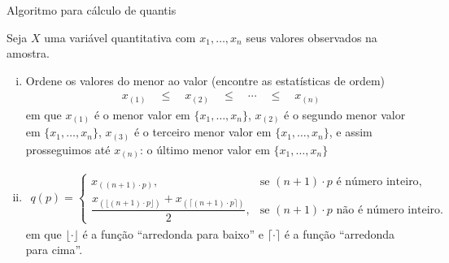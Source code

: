 \documentclass[8pt]{beamer}
\begin{document}
\begin{frame}{Algoritmo para cálculo de quantis}
 
 Seja $X$ uma variável quantitativa com $x_1, \dots, x_n$ seus valores observados na amostra. 
 \vfill
 
  \begin{enumerate}[i.]
   \item Ordene os valores do menor ao valor (encontre as estatísticas de ordem)
   \begin{align*}
    x_{(1)} \quad \leq \quad x_{(2)} \quad \leq \quad \cdots \quad \leq \quad x_{(n)}
   \end{align*}
   em que $x_{(1)}$ é o menor valor em $\{x_1, \dots, x_n\}$, $x_{(2)}$ é o segundo menor valor em $\{x_1, \dots, x_n\}$, $x_{(3)}$ é o terceiro menor valor em $\{x_1, \dots, x_n\}$, e assim prosseguimos até
   $x_{(n)}$: o último menor valor em $\{x_1, \dots, x_n\}$
   \vfill
   
   \item 
   \begin{align*}
    q(p) = \begin{cases}
            x_{\left((n+1)\cdot p \right)}, & \mbox{se } (n+1)\cdot p \mbox{ é número inteiro},\\
            \dfrac{x_{\left(\lfloor(n+1)\cdot p\rfloor \right)} + x_{\left( \lceil(n+1)\cdot p \rceil \right)}}{2}, & \mbox{se } (n+1)\cdot p \mbox{ não é número inteiro}.
           \end{cases}
   \end{align*}
   em que $\lfloor \cdot \rfloor$ é a função ``arredonda para baixo'' e $\lceil \cdot \rceil$ é a função ``arredonda para cima''.
  \end{enumerate}
\end{frame}
\end{document}
